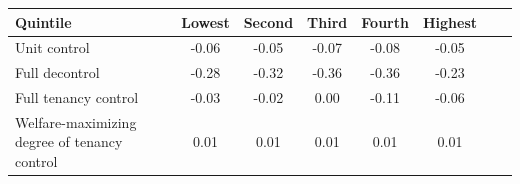 \begin{table}[p]
\footnotesize
\renewcommand{\arraystretch}{1.2}
\begin{center}

\begin{tabular}{lccccccc}
\toprule
Quintile & Lowest & Second & Third & Fourth & Highest\\ 
\midrule
Unit control & -0.06 & -0.05 & -0.07 & -0.08 & 
-0.05 \\
Full decontrol & -0.28 & -0.32 & -0.36 & -0.36 & 
-0.23 \\
Full tenancy control & -0.03 & -0.02 & 0.00 & -0.11 & -0.06 \\
Welfare-maximizing degree of tenancy control & 0.01 & 0.01 & 0.01 & 0.01 & 0.01\\
\bottomrule
\end{tabular}
\end{center}
\normalsize
\end{table}
